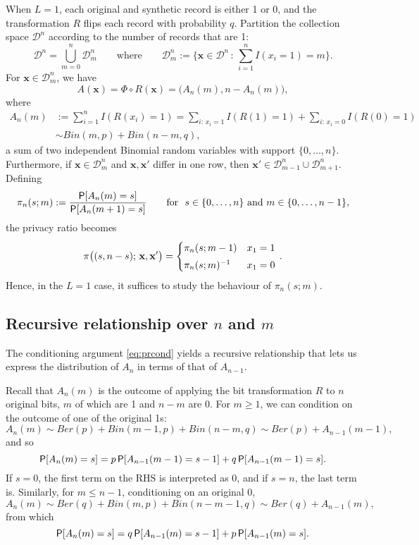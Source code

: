\documentclass[11pt]{article}
\newcommand{\Dsp}{\mathcal{D}}
\newcommand{\xv}{\mathbf{x}}
\begin{document}
When $L=1$, each original and synthetic record is either 1 or 0, and the transformation $R$ flips each record with probability $q$.
Partition the collection space $\Dsp^n$ according to the number of records that are 1:
\[ \Dsp^n = \bigcup_{m = 0}^n \Dsp_m^n
\quad\quad\text{where}\quad\quad
\Dsp_m^n := \bigg\{ \xv\in\Dsp^n \,:\, \sum_{i=1}^n I(x_i = 1) = m \bigg\}.
\]
For $\xv\in\Dsp_m^n$, we have
\[ A(\xv) = \Phi\circ R(\xv) = \big(A_n(m), n - A_n(m)\big), \]
where
\begin{align*}
A_n(m) &:= \sum_{i=1}^n I(R(x_i) = 1)
= \sum_{i:\, x_i = 1} I(R(1) = 1) + \sum_{i:\, x_i = 0} I(R(0) = 1) \\
&\sim Bin(m, p) + Bin(n-m, q),
\end{align*}
a sum of two independent Binomial random variables with support $\{0,\dots,n\}$.
Furthermore, if $\xv\in\Dsp_m^n$ and $\xv,\xv'$ differ in one row, then $\xv'\in\Dsp_{m-1}^n \cup \Dsp_{m+1}^n$.
Defining
\[ \pi_n(s; m) := \frac{\P[A_n(m) = s]}{\P[A_n(m+1) = s]}
\quad\quad\text{for}\ \ 
s\in\{0,\dots,n\}\ \text{and}\ m\in\{0,\dots,n-1\},
\]
the privacy ratio becomes
\[ \pi\big((s, n-s);\,\xv,\xv'\big) =
\begin{cases}
\pi_n(s;m - 1) & x_1 = 1 \\[0.3em]
\inv{\pi_n(s;m)} & x_1 = 0
\end{cases}\, .
\]
Hence, in the $L=1$ case, it suffices to study the behaviour of $\pi_n(s;m)$.


\subsection{Recursive relationship over $n$ and $m$}

The conditioning argument \eqref{eq:prcond} yields a recursive relationship that lets us express the distribution of $A_n$ in terms of that of $A_{n-1}$.

Recall that $A_n(m)$ is the outcome of applying the bit transformation $R$ to $n$ original bits, $m$ of which are 1 and $n-m$ are 0.
For $m \geq 1$, we can condition on the outcome of one of the original 1s:
\[ A_n(m) \sim Ber(p) + Bin(m-1, p) + Bin(n-m, q) \sim Ber(p) + A_{n-1}(m-1), \]
and so
\begin{equation}\label{eq:rec1}
\P[A_n(m) = s] = p\P[A_{n-1}(m-1) = s-1] + q\P[A_{n-1}(m-1) = s].
\end{equation}
If $s = 0$, the first term on the RHS is interpreted as 0, and if $s = n$, the last term is.
Similarly, for $m \leq n-1$, conditioning on an original 0,
\[ A_n(m) \sim Ber(q) + Bin(m, p) + Bin(n-m-1, q) \sim Ber(q) + A_{n-1}(m), \]
from which
\begin{equation}\label{eq:rec0}
\P[A_n(m) = s] = q\P[A_{n-1}(m) = s-1] + p\P[A_{n-1}(m) = s].
\end{equation}
\end{document}
